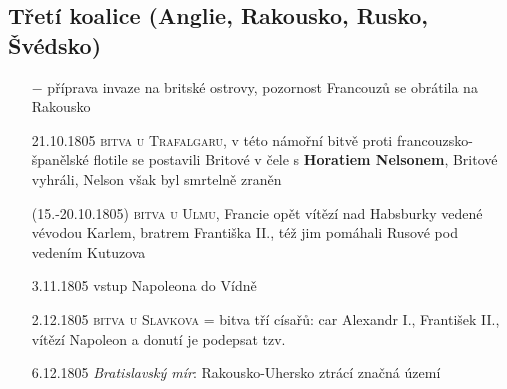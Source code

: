 \documentclass{article}
\begin{document}
\subsection*{Třetí koalice (Anglie, Rakousko, Rusko, Švédsko)}
\begin{itemize}
    \vspace{-0.5em}
    \setlength\itemsep{0.15em}
    \item[$-$] příprava invaze na britské ostrovy, pozornost Francouzů se obrátila na Rakousko
    \item[21.10.1805] \textsc{bitva u Trafalgaru}, v této námořní bitvě proti francouzsko-španělské flotile se postavili Britové v čele s \textbf{Horatiem Nelsonem}, Britové vyhráli, Nelson však byl smrtelně zraněn
    \item[(15.-20.10.1805)] \textsc{bitva u Ulmu}, Francie opět vítězí nad Habsburky vedené vévodou Karlem, bratrem Františka II., též jim pomáhali Rusové pod vedením Kutuzova
    \item[3.11.1805] vstup Napoleona do Vídně
    \item[2.12.1805] \textsc{bitva u Slavkova} = bitva tří císařů: car Alexandr I., František II., vítězí Napoleon a donutí je podepsat tzv.
    \item[6.12.1805] \textit{Bratislavský mír}: Rakousko-Uhersko ztrácí značná území
\end{itemize}
\end{document}
